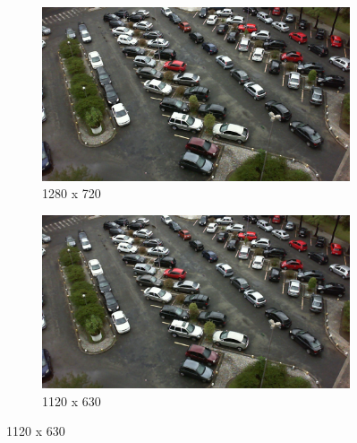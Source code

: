 \begin{figure}[H]
    \begin{subfigure}{.5\textwidth}
        \centering
        \includegraphics[width=.85\linewidth]{img/conception/image_process/downsample_only/7.png}
        \caption{1280 x 720}
    \end{subfigure}%
    \begin{subfigure}{.5\textwidth}
        \centering
        \includegraphics[width=.85\linewidth]{img/conception/image_process/downsample_only/6.png}
        \caption{1120 x 630}
    \end{subfigure}%


\end{figure}
